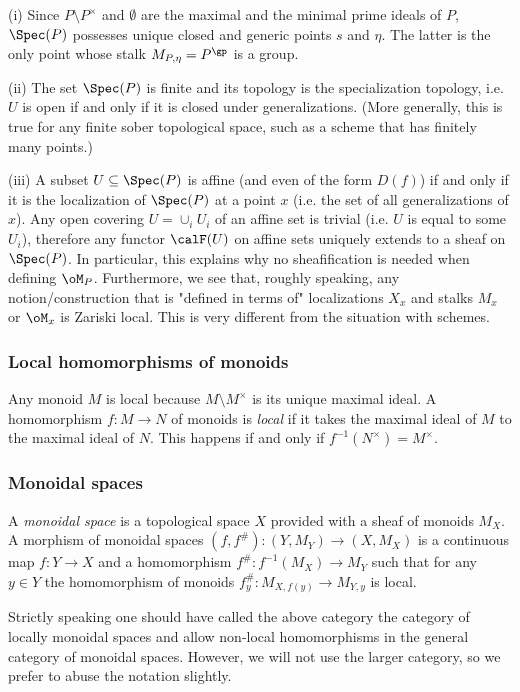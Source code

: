 \documentclass[10pt]{../fichiers-configuration-latex/smfart}
\begin{document}
\begin{remark2}\label{8-specrem} (i) Since $P\setminus P^\times$
and $\emptyset$ are the maximal and the minimal prime ideals of
$P$, $\Spec(P)$ possesses unique closed and generic points $s$ and
$\eta$. The latter is the only point whose stalk $M_{P,\eta}=P^\gp$
is a group.

(ii) The set $\Spec(P)$ is finite and its topology is the
specialization topology, i.e. $U$ is open if and only if it is
closed under generalizations. (More generally, this is true for any
finite sober topological space, such as a scheme that has finitely
many points.)

(iii) A subset $U\subseteq\Spec(P)$ is affine (and even of the form
$D(f)$) if and only if it is the localization of $\Spec(P)$ at a
point $x$ (i.e. the set of all generalizations of $x$). Any open
covering $U=\cup_i U_i$ of an affine set is trivial (i.e. $U$
is equal to some $U_i$), therefore any functor $\calF(U)$
on affine sets uniquely extends to a sheaf on $\Spec(P)$. In
particular, this explains why no sheafification is needed when
defining $\oM_P$. Furthermore, we see that, roughly speaking, any
notion/construction that is "defined in terms of" localizations
$X_x$ and stalks $M_x$ or $\oM_x$ is Zariski local. This is very
different from the situation with schemes.  \end{remark2}

\subsubsection{Local homomorphisms of monoids}\label{8-localhomsec}
Any monoid $M$ is local because $M\setminus M^\times$ is its unique
maximal ideal. A homomorphism $f{\colon}M\to N$ of monoids is {\em
local} if it takes the maximal ideal of $M$ to the maximal ideal
of $N$. This happens if and only if $f^{-1}(N^\times)=M^\times$.

\subsubsection{Monoidal spaces}\label{8-monoidspsec} A {\em
monoidal space} is a topological space $X$ provided with
a sheaf of monoids $M_X$. A morphism of monoidal spaces
$(f,f^\#){\colon}(Y,M_Y)\to(X,M_X)$ is a continuous map
$f{\colon}Y\to X$ and a homomorphism $f^\#{\colon}f^{-1}(M_X)\to
M_Y$ such that for any $y\in Y$ the homomorphism of monoids
$f_y^\#{\colon}{M}_{X,f(y)}\to{M}_{Y,y}$ is local.

\begin{remark2} Strictly speaking one should have called the above
category the category of locally monoidal spaces and allow non-local
homomorphisms in the general category of monoidal spaces. However,
we will not use the larger category, so we prefer to abuse the
notation slightly.  \end{remark2}
\end{document}
